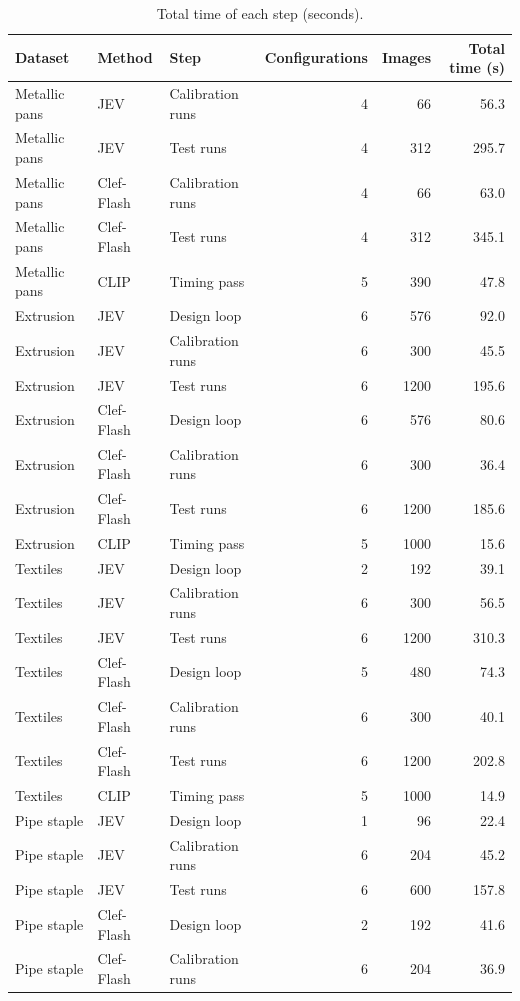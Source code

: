 \begin{table}

\caption{\label{tab:tbl-total-time}Total time of each step (seconds).}
\centering
\begin{tabular}[t]{lllrrr}
\toprule
Dataset & Method & Step & Configurations & Images & Total time (s)\\
\midrule
Metallic pans & JEV & Calibration runs & 4 & 66 & 56.3\\
Metallic pans & JEV & Test runs & 4 & 312 & 295.7\\
Metallic pans & Clef-Flash & Calibration runs & 4 & 66 & 63.0\\
Metallic pans & Clef-Flash & Test runs & 4 & 312 & 345.1\\
Metallic pans & CLIP & Timing pass & 5 & 390 & 47.8\\
\addlinespace
Extrusion & JEV & Design loop & 6 & 576 & 92.0\\
Extrusion & JEV & Calibration runs & 6 & 300 & 45.5\\
Extrusion & JEV & Test runs & 6 & 1200 & 195.6\\
Extrusion & Clef-Flash & Design loop & 6 & 576 & 80.6\\
Extrusion & Clef-Flash & Calibration runs & 6 & 300 & 36.4\\
\addlinespace
Extrusion & Clef-Flash & Test runs & 6 & 1200 & 185.6\\
Extrusion & CLIP & Timing pass & 5 & 1000 & 15.6\\
Textiles & JEV & Design loop & 2 & 192 & 39.1\\
Textiles & JEV & Calibration runs & 6 & 300 & 56.5\\
Textiles & JEV & Test runs & 6 & 1200 & 310.3\\
\addlinespace
Textiles & Clef-Flash & Design loop & 5 & 480 & 74.3\\
Textiles & Clef-Flash & Calibration runs & 6 & 300 & 40.1\\
Textiles & Clef-Flash & Test runs & 6 & 1200 & 202.8\\
Textiles & CLIP & Timing pass & 5 & 1000 & 14.9\\
Pipe staple & JEV & Design loop & 1 & 96 & 22.4\\
\addlinespace
Pipe staple & JEV & Calibration runs & 6 & 204 & 45.2\\
Pipe staple & JEV & Test runs & 6 & 600 & 157.8\\
Pipe staple & Clef-Flash & Design loop & 2 & 192 & 41.6\\
Pipe staple & Clef-Flash & Calibration runs & 6 & 204 & 36.9\\

\end{tabular}
\end{table}
